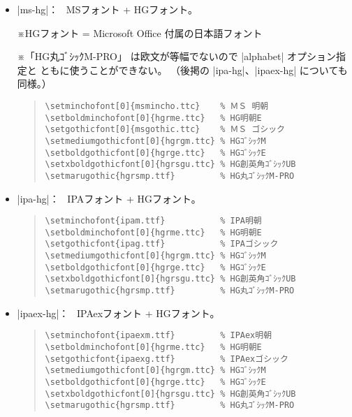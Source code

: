 \documentclass[uplatex,dvipdfmx,a4paper]{jsarticle}
\newcommand{\Note}{\par\noindent ※}
\newcommand{\Means}{：\ }
\begin{document}
\begin{itemize}
\item |ms-hg|\Means
  MSフォント + HGフォント。
  \Note HGフォント = Microsoft Office 付属の日本語フォント
  \Note 「HG丸ｺﾞｼｯｸM-PRO」
  は欧文が等幅でないので |alphabet| オプション指定と
  ともに使うことができない。
  （後掲の |ipa-hg|、|ipaex-hg| についても同様。）

\begin{quote}\small\begin{verbatim}
\setminchofont[0]{msmincho.ttc}    % ＭＳ 明朝
\setboldminchofont[0]{hgrme.ttc}   % HG明朝E
\setgothicfont[0]{msgothic.ttc}    % ＭＳ ゴシック
\setmediumgothicfont[0]{hgrgm.ttc} % HGｺﾞｼｯｸM
\setboldgothicfont[0]{hgrge.ttc}   % HGｺﾞｼｯｸE
\setxboldgothicfont[0]{hgrsgu.ttc} % HG創英角ｺﾞｼｯｸUB
\setmarugothic{hgrsmp.ttf}         % HG丸ｺﾞｼｯｸM-PRO 
\end{verbatim}\end{quote}

\item |ipa-hg|\Means
   IPAフォント + HGフォント。
\begin{quote}\small\begin{verbatim}
\setminchofont{ipam.ttf}           % IPA明朝
\setboldminchofont[0]{hgrme.ttc}   % HG明朝E
\setgothicfont{ipag.ttf}           % IPAゴシック
\setmediumgothicfont[0]{hgrgm.ttc} % HGｺﾞｼｯｸM
\setboldgothicfont[0]{hgrge.ttc}   % HGｺﾞｼｯｸE
\setxboldgothicfont[0]{hgrsgu.ttc} % HG創英角ｺﾞｼｯｸUB
\setmarugothic{hgrsmp.ttf}         % HG丸ｺﾞｼｯｸM-PRO 
\end{verbatim}\end{quote}

\item |ipaex-hg|\Means
   IPAexフォント + HGフォント。
\begin{quote}\small\begin{verbatim}
\setminchofont{ipaexm.ttf}         % IPAex明朝
\setboldminchofont[0]{hgrme.ttc}   % HG明朝E
\setgothicfont{ipaexg.ttf}         % IPAexゴシック
\setmediumgothicfont[0]{hgrgm.ttc} % HGｺﾞｼｯｸM
\setboldgothicfont[0]{hgrge.ttc}   % HGｺﾞｼｯｸE
\setxboldgothicfont[0]{hgrsgu.ttc} % HG創英角ｺﾞｼｯｸUB
\setmarugothic{hgrsmp.ttf}         % HG丸ｺﾞｼｯｸM-PRO 
\end{verbatim}\end{quote}


\end{itemize}
\end{document}
